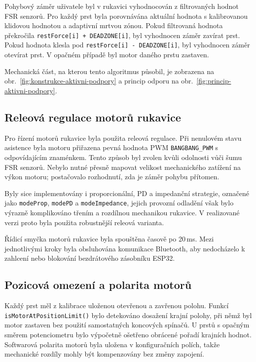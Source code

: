 Pohybový záměr uživatele byl v rukavici vyhodnocován z filtrovaných hodnot FSR senzorů. Pro každý prst byla porovnávána aktuální hodnota s kalibrovanou klidovou hodnotou a adaptivní mrtvou zónou. Pokud filtrovaná hodnota překročila \texttt{restForce[i] + DEADZONE[i]}, byl vyhodnocen záměr zavírat prst. Pokud hodnota klesla pod \texttt{restForce[i] - DEADZONE[i]}, byl vyhodnocen záměr otevírat prst. V opačném případě byl motor daného prstu zastaven.

Mechanická část, na kterou tento algoritmus působil, je zobrazena na obr.~\ref{fig:konstrukce-aktivni-podpory} a princip odporu na obr.~\ref{fig:princip-aktivni-podpory}.

\subsection{Releová regulace motorů rukavice}
\label{subsec:releova-regulace}

Pro řízení motorů rukavice byla použita releová regulace. Při nenulovém stavu asistence byla motoru přiřazena pevná hodnota PWM \texttt{BANGBANG\_PWM} s odpovídajícím znaménkem. Tento způsob byl zvolen kvůli odolnosti vůči šumu FSR senzorů. Nebylo nutné přesně mapovat velikost mechanického zatížení na výkon motoru; postačovalo rozhodnutí, zda je záměr pohybu přítomen.

Byly sice implementovány i proporcionální, PD a impedanční strategie, označené jako \texttt{modeProp}, \texttt{modePD} a \texttt{modeImpedance}, jejich provozní odladění však bylo výrazně komplikováno třením a rozdílnou mechanikou rukavice. V realizované verzi proto byla použita robustnější releová varianta.

Řídicí smyčka motorů rukavice byla spouštěna časově po 20\,ms. Mezi jednotlivými kroky byla obsluhována komunikace Bluetooth, aby nedocházelo k zahlcení nebo blokování bezdrátového zásobníku ESP32.

\subsection{Pozicová omezení a polarita motorů}
\label{subsec:pozicova-omezeni}

Každý prst měl z kalibrace uloženou otevřenou a zavřenou polohu. Funkcí \texttt{isMotorAtPositionLimit()} bylo detekováno dosažení krajní polohy, při němž byl motor zastaven bez použití samostatných koncových spínačů. U prstů s opačným směrem potenciometru bylo výpočetně ošetřeno obrácené pořadí krajních hodnot. Softwarová polarita motorů byla uložena v konfiguračních polích, takže mechanické rozdíly mohly být kompenzovány bez změny zapojení.

